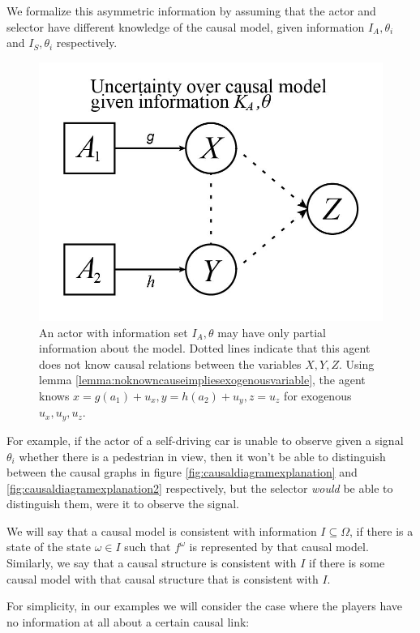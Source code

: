 \indent We formalize this asymmetric information by assuming that the actor and selector have different knowledge of the causal model, given information $I_A,\theta_i$ and $I_S,\theta_i$ respectively. 
\begin{figure}\ContinuedFloat
	\centering	\includegraphics[width=0.7\linewidth]{"images/diagramexplanations/3-unknowncausalmodel"}
	\captionsetup{labelfont=bf,font=small,labelsep=period,singlelinecheck=off}
	\caption{\rightskip=10pt\leftskip=10pt An actor with information set $I_A,\theta$ may have only partial information about the model. Dotted lines indicate that this agent does not know causal relations between the variables $X,Y,Z$. Using lemma \ref{lemma:noknowncauseimpliesexogenousvariable}, the agent knows $x=g(a_1)+u_x,y=h(a_2)+u_y,z=u_z$ for exogenous $u_x,u_y,u_z$.}
	\label{fig:3-unknowncausalmodel}
\end{figure}
\indent For example, if the actor of a self-driving car is unable to observe given a signal $\theta_i$ whether there is a pedestrian in view, then it won't be able to distinguish between the causal graphs in figure \ref{fig:causaldiagramexplanation} and \ref{fig:causaldiagramexplanation2} respectively, but the selector \textit{would} be able to distinguish them, were it to observe the signal.



We will say that a causal model is consistent with information $I\subseteq \Omega$, if there is a state of the state $\omega\in I$ such that $f^\omega$ is represented by that causal model. Similarly, we say that a causal structure is consistent with $I$ if there is some causal model with that causal structure that is consistent with $I$. 

For simplicity, in our examples we will consider the case where the players have no information at all about a certain causal link:


